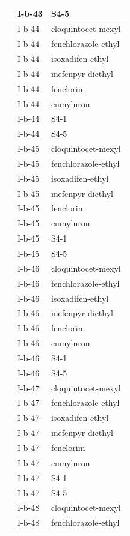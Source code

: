 \documentclass[11pt,a4paper]{article}
\begin{document}
\begin{table}[h]
\begin{tabular}{|l|l|l|}
 & I-b-43 & S4-5 \\ \hline
 & I-b-44 & cloquintocet-mexyl \\ \hline
 & I-b-44 & fenchlorazole-ethyl \\ \hline
 & I-b-44 & isoxadifen-ethyl \\ \hline
 & I-b-44 & mefenpyr-diethyl \\ \hline
 & I-b-44 & fenclorim \\ \hline
 & I-b-44 & cumyluron \\ \hline
 & I-b-44 & S4-1 \\ \hline
 & I-b-44 & S4-5 \\ \hline
 & I-b-45 & cloquintocet-mexyl \\ \hline
 & I-b-45 & fenchlorazole-ethyl \\ \hline
 & I-b-45 & isoxadifen-ethyl \\ \hline
 & I-b-45 & mefenpyr-diethyl \\ \hline
 & I-b-45 & fenclorim \\ \hline
 & I-b-45 & cumyluron \\ \hline
 & I-b-45 & S4-1 \\ \hline
 & I-b-45 & S4-5 \\ \hline
 & I-b-46 & cloquintocet-mexyl \\ \hline
 & I-b-46 & fenchlorazole-ethyl \\ \hline
 & I-b-46 & isoxadifen-ethyl \\ \hline
 & I-b-46 & mefenpyr-diethyl \\ \hline
 & I-b-46 & fenclorim \\ \hline
 & I-b-46 & cumyluron \\ \hline
 & I-b-46 & S4-1 \\ \hline
 & I-b-46 & S4-5 \\ \hline
 & I-b-47 & cloquintocet-mexyl \\ \hline
 & I-b-47 & fenchlorazole-ethyl \\ \hline
 & I-b-47 & isoxadifen-ethyl \\ \hline
 & I-b-47 & mefenpyr-diethyl \\ \hline
 & I-b-47 & fenclorim \\ \hline
 & I-b-47 & cumyluron \\ \hline
 & I-b-47 & S4-1 \\ \hline
 & I-b-47 & S4-5 \\ \hline
 & I-b-48 & cloquintocet-mexyl \\ \hline
 & I-b-48 & fenchlorazole-ethyl \\ \hline

\end{tabular}
\end{table}
\end{document}
